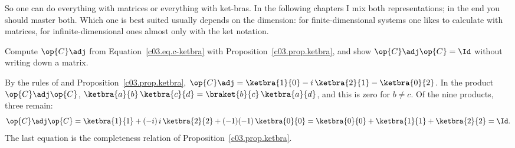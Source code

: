 So one can do everything with matrices or everything with ket-bras. In the following chapters I
mix both representations; in the end you should master both. Which one is best suited usually
depends on the dimension: for finite-dimensional systems one likes to calculate with matrices,
for infinite-dimensional ones almost only with the ket notation.

\begin{exercise}\label{c03.exc.ketbra}
  Compute $\op{C}\adj$ from Equation~\eqref{c03.eq.c-ketbra} with
  Proposition~\ref{c03.prop.ketbra}, and show $\op{C}\adj\op{C} = \Id$ without writing down a
  matrix.
\end{exercise}
\begin{solution}
  By the rules of  and Proposition~\ref{c03.prop.ketbra},
  $\op{C}\adj = \ketbra{1}{0} - i\, \ketbra{2}{1} - \ketbra{0}{2}$. In the product
  $\op{C}\adj\op{C}$, $\ketbra{a}{b}\, \ketbra{c}{d} = \braket{b}{c}\, \ketbra{a}{d}$, and this is
  zero for $b \neq c$. Of the nine products, three remain:
  \begin{equation}\label{c03.eq.c-ketbra-unitaer}
    \op{C}\adj\op{C}
    = \ketbra{1}{1} + (-i)\, i\, \ketbra{2}{2} + (-1)(-1)\, \ketbra{0}{0}
    = \ketbra{0}{0} + \ketbra{1}{1} + \ketbra{2}{2}
    = \Id .
  \end{equation}
  The last equation is the completeness relation of Proposition~\ref{c03.prop.ketbra}.
\end{solution}

